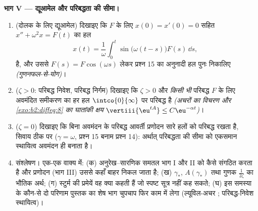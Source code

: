 \begin{problem}
\medskip
\noindent\textbf{भाग V --- द्यूआमेल और परिबद्धता की सीमा।}
\begin{enumerate}[resume]
  \item (दोलक के लिए द्यूआमेल) दिखाइए कि  $F$ के लिए $x(0) = x'(0) = 0$ सहित $x'' + \omega^2x =
        F(t)$ का
        हल
        \[
        x(t) = \frac1\omega\int_0^t\sin\bigl(\omega(t -
        s)\bigr)F(s)\,\dd s ,
        \]
        है, और उससे $F(s) = F\cos(\omega s)$ लेकर प्रश्न 15 का अनुनादी हल पुनः निकालिए
        \emph{(गुणनफल-से-योग)}।
  \item ($\zeta > 0$: परिबद्ध निवेश, परिबद्ध निर्गम) दिखाइए कि $\zeta > 0$ और \emph{किसी
        भी} परिबद्ध  $F$ के लिए अवमंदित समीकरण का हर हल $\intco{0}{\infty}$ पर
        परिबद्ध है \emph{(अचरों का विचरण और \cref{exo:b2:diffeq:8} का घातांकी क्षय $\vertiii{\eu^{tA}} \leq
        C\eu^{-\alpha t}$)}।
  \item ($\zeta = 0$) दिखाइए कि बिना अवमंदन के परिबद्ध आवर्ती प्रणोदन सारे हलों
        को परिबद्ध रखता है, सिवाय ठीक  पर ($\gamma =
        \omega$, प्रश्न 15 बनाम
        प्रश्न 14): अर्थात् परिबद्धता की सीमा को एकसमान स्थायित्व अवमंदन
        ही बनाता है।
  \item संश्लेषण। एक-एक वाक्य में: (क) अनुरेख--सारणिक समतल भाग I और II को
        कैसे संगठित करता है और प्रणोदन (भाग III) उससे कहाँ बाहर निकल जाता
        है; (ख) $\gamma_*$, $A(\gamma_*)$ तथा गुणक $\frac1{2\zeta}$ का भौतिक अर्थ; (ग) स्टुर्म की
        प्रमेयें वह क्या कहती हैं जो स्पष्ट सूत्र नहीं कह सकते; (घ) इस
        समस्या के कौन-से दो परिणाम पुस्तक का शेष भाग चुपचाप फिर काम में
        लेगा (ल्यूविल-अचर ; परिबद्ध-निवेश स्थायित्व)।
\end{enumerate}
\end{problem}
